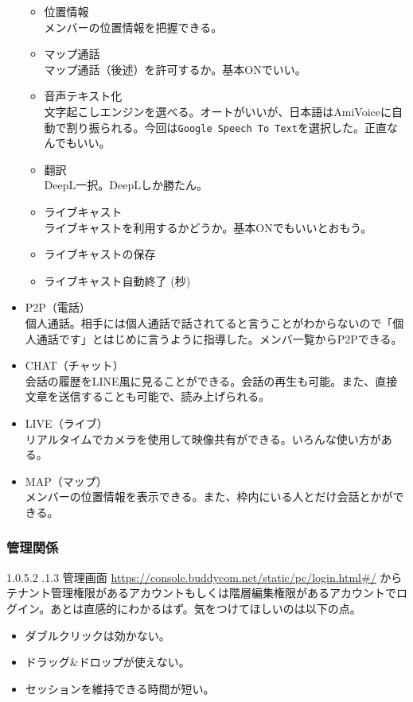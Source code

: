 \documentclass[dvipdfmx,jb5]{jarticle}
\makeatletter
\newcommand{\subsubsubsection}{\@startsection{paragraph}{4}{\z@}%
    {1.0\Cvs \@plus.5\Cdp \@minus.2\Cdp}%
    {.1\Cvs \@plus.3\Cdp}%
    {\reset@font}
  }
\makeatother
\begin{document}
\begin{itemize}
\begin{itemize}
\item 位置情報\\
メンバーの位置情報を把握できる。
\item マップ通話\\
マップ通話（後述）を許可するか。基本ONでいい。
\item 音声テキスト化\\
文字起こしエンジンを選べる。オートがいいが、日本語はAmiVoiceに自動で割り振られる。今回は\verb|Google Speech To Text|を選択した。正直なんでもいい。
\item 翻訳\\
DeepL一択。DeepLしか勝たん。
\item ライブキャスト\\
ライブキャストを利用するかどうか。基本ONでもいいとおもう。
\item ライブキャストの保存
\item ライブキャスト自動終了 (秒)
\end{itemize}
\item P2P（電話）\\
個人通話。相手には個人通話で話されてると言うことがわからないので「個人通話です」とはじめに言うように指導した。メンバ一覧からP2Pできる。
\item CHAT（チャット）\\
会話の履歴をLINE風に見ることができる。会話の再生も可能。また、直接文章を送信することも可能で、読み上げられる。
\item LIVE（ライブ）\\
リアルタイムでカメラを使用して映像共有ができる。いろんな使い方がある。
\item MAP（マップ）\\
メンバーの位置情報を表示できる。また、枠内にいる人とだけ会話とかができる。
\end{itemize}

\subsubsection{管理関係}
\subsubsubsection{管理画面}
\url{https://console.buddycom.net/static/pc/login.html#/} からテナント管理権限があるアカウントもしくは階層編集権限があるアカウントでログイン。あとは直感的にわかるはず。気をつけてほしいのは以下の点。

\begin{itemize}
\item ダブルクリックは効かない。
\item ドラッグ\&ドロップが使えない。
\item セッションを維持できる時間が短い。
\end{itemize}
\end{document}
